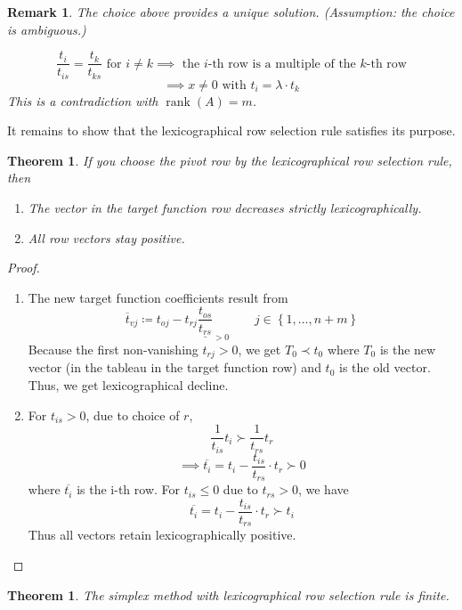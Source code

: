 \documentclass{article}
\newcounter{lecref}[section]
\numberwithin{lecref}{section}
\newtheorem{theorem}[lecref]{Theorem}
\newtheorem*{Remark}{Remark}
\newcommand{\Set}[1]{\left\{#1\right\}}
\begin{document}
\begin{Remark}
	The choice above provides a unique solution.
	(Assumption: the choice is ambiguous.)

	\[ \frac{t_{i}}{t_{is}} = \frac{t_k}{t_{ks}} \text{ for } i \neq k \implies \text{ the $i$-th row is a multiple of the $k$-th row} \]
	\[ \implies x \neq 0 \text{ with } t_i = \lambda \cdot t_k \]
	This is a contradiction with $\operatorname{rank}(A) = m$.
\end{Remark}

It remains to show that the lexicographical row selection rule satisfies its purpose.

\begin{theorem}
	\label{theorem:2.2}
	If you choose the pivot row by the lexicographical row selection rule, then
	\begin{enumerate}
		\item The vector in the target function row decreases strictly lexicographically.
		\item All row vectors stay positive.
	\end{enumerate}
\end{theorem}

\begin{proof}
	\begin{enumerate}
		\item The new target function coefficients result from
			\[ \overline{t}_{vj} \coloneqq t_{oj} - t_{rj} \underline{\frac{t_{os}}{t_{rs}}}_{> 0} \qquad j \in \Set{1, \dots, n+m} \]
			Because the first non-vanishing $t_{rj} > 0$, we get $T_0 \prec t_0$ where $T_0$ is the new vector (in the tableau in the target function row) and $t_0$ is the old vector.
			Thus, we get lexicographical decline.
		\item For $t_{is} > 0$, due to choice of $r$,
			\[ \frac{1}{t_{is}} t_i \succ \frac{1}{t_{rs}} t_r \]
			\[ \implies \overline{t_i} = t_i - \frac{t_{is}}{t_{rs}} \cdot t_r \succ 0 \]
			where $\overline{t_i}$ is the i-th row. For $t_{is} \leq 0$ due to $t_{rs} > 0$, we have
			\[ \overline{t_i} = t_i - \frac{t_{is}}{t_{rs}} \cdot t_r \succ t_i \]
			Thus all vectors retain lexicographically positive.
	\end{enumerate}
\end{proof}

\begin{theorem}
	\label{theorem:2.3}
	The simplex method with lexicographical row selection rule is finite.
\end{theorem}
\end{document}
